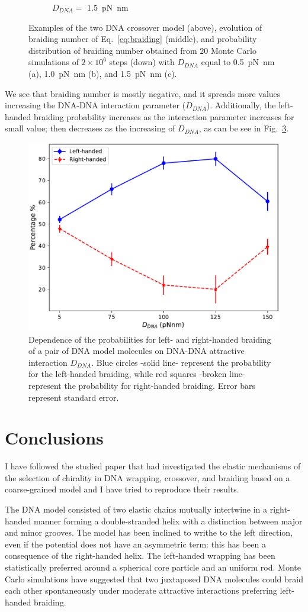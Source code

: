 \documentclass[a4paper,10pt]{article}
\begin{document}
\begin{figure}[tb]
\begin{subfigure}{.3\textwidth}
\caption{$D_{DNA}=$ \SI{1.5}{\pico\newton\nano\meter}}
\label{fig:braD_c}
\end{subfigure}
\caption{Examples of the two DNA crossover model (above), evolution of braiding number of Eq.~\ref{eq:braiding} (middle), and probability distribution of braiding number obtained from $20$ Monte Carlo simulations of $2\times 10^6$ steps (down) with $D_{DNA}$ equal to \SI{0.5}{\pico\newton\nano\meter} (a), \SI{1.0}{\pico\newton\nano\meter} (b), and \SI{1.5}{\pico\newton\nano\meter} (c).}
\label{fig:braD}
\end{figure}

We see that braiding number is mostly negative, and it spreads more values increasing the DNA-DNA interaction parameter ($D_{DNA}$).
Additionally, the left-handed braiding probability increases as the interaction parameter increases for small value; then decreases as the increasing of $D_{DNA}$, as can be see in Fig.~\ref{fig:braD_pr}.

\begin{figure}[tb]
\centering
\includegraphics[width=.5\textwidth]{brD_br_gr.pdf}
\caption{Dependence of the probabilities for left- and right-handed braiding of a pair of DNA model molecules on DNA-DNA attractive interaction $D_{DNA}$.
Blue circles -solid line- represent the probability for the left-handed braiding, while red squares -broken line- represent the probability for right-handed braiding.
Error bars represent standard error.}
\label{fig:braD_pr}
\end{figure}

\section{Conclusions}
I have followed the studied paper that had investigated the elastic mechanisms of the selection of chirality in DNA wrapping, crossover, and braiding based on a coarse-grained model and I have tried to reproduce their results.

The DNA model consisted of two elastic chains mutually intertwine in a right-handed manner forming a double-stranded helix with a distinction between major and minor grooves.
The model has been inclined to writhe to the left direction, even if the potential does not have an asymmetric term: this has been a consequence of the right-handed helix.
The left-handed wrapping has been statistically preferred around a spherical core particle and an uniform rod.
Monte Carlo simulations have suggested that two juxtaposed DNA molecules could braid each other spontaneously under moderate attractive interactions preferring left-handed braiding.
\end{document}
